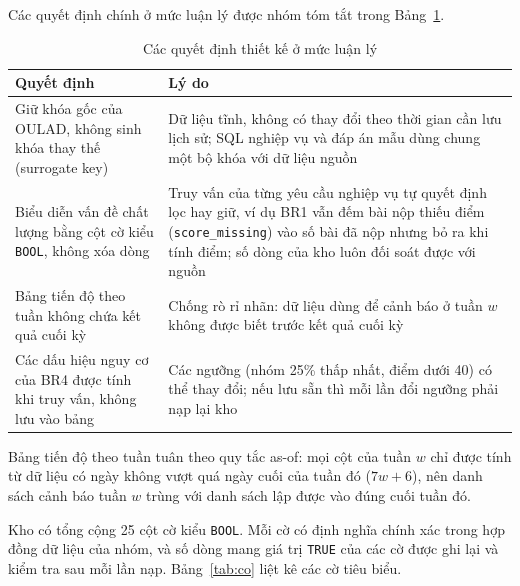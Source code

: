 Các quyết định chính ở mức luận lý được nhóm tóm tắt trong Bảng~\ref{tab:quyet-dinh}.

\newpage

\begin{table}[htbp]
\centering
\small
\begin{tabularx}{\textwidth}{|p{5.2cm}|X|}
\hline
\textbf{Quyết định} & \textbf{Lý do} \\ \hline
Giữ khóa gốc của OULAD, không sinh khóa thay thế (surrogate key) & Dữ liệu tĩnh, không có thay đổi theo thời gian cần lưu lịch sử; SQL nghiệp vụ và đáp án mẫu dùng chung một bộ khóa với dữ liệu nguồn \\ \hline
Biểu diễn vấn đề chất lượng bằng cột cờ kiểu \texttt{BOOL}, không xóa dòng & Truy vấn của từng yêu cầu nghiệp vụ tự quyết định lọc hay giữ, ví dụ BR1 vẫn đếm bài nộp thiếu điểm (\texttt{score\_missing}) vào số bài đã nộp nhưng bỏ ra khi tính điểm; số dòng của kho luôn đối soát được với nguồn \\ \hline
Bảng tiến độ theo tuần không chứa kết quả cuối kỳ & Chống rò rỉ nhãn: dữ liệu dùng để cảnh báo ở tuần $w$ không được biết trước kết quả cuối kỳ \\ \hline
Các dấu hiệu nguy cơ của BR4 được tính khi truy vấn, không lưu vào bảng & Các ngưỡng (nhóm 25\% thấp nhất, điểm dưới 40) có thể thay đổi; nếu lưu sẵn thì mỗi lần đổi ngưỡng phải nạp lại kho \\ \hline
\end{tabularx}
\caption{Các quyết định thiết kế ở mức luận lý}
\label{tab:quyet-dinh}
\end{table}

Bảng tiến độ theo tuần tuân theo quy tắc as-of: mọi cột của tuần $w$ chỉ được tính từ dữ liệu có ngày không vượt quá ngày cuối của tuần đó ($7w + 6$), nên danh sách cảnh báo tuần $w$ trùng với danh sách lập được vào đúng cuối tuần đó.

Kho có tổng cộng 25 cột cờ kiểu \texttt{BOOL}. Mỗi cờ có định nghĩa chính xác trong hợp đồng dữ liệu của nhóm, và số dòng mang giá trị \texttt{TRUE} của các cờ được ghi lại và kiểm
tra sau mỗi lần nạp.
Bảng~\ref{tab:co} liệt kê các cờ tiêu biểu.


